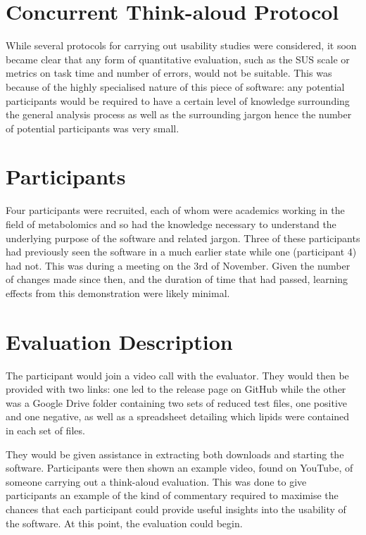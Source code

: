 \documentclass{l4proj}
\begin{document}
\section{Concurrent Think-aloud Protocol} \label{think-aloud-protocol}
While several protocols for carrying out usability studies were considered, it soon became clear that any form of quantitative evaluation, such as the SUS scale or metrics on task time and number of errors, would not be suitable. This was because of the highly specialised nature of this piece of software: any potential participants would be required to have a certain level of knowledge surrounding the general analysis process as well as the surrounding jargon hence the number of potential participants was very small.

\section{Participants}
Four participants were recruited, each of whom were academics working in the field of metabolomics and so had the knowledge necessary to understand the underlying purpose of the software and related jargon. Three of these participants had previously seen the software in a much earlier state while one (participant 4) had not. This was during a meeting on the 3rd of November. Given the number of changes made since then, and the duration of time that had passed, learning effects from this demonstration were likely minimal.

\section{Evaluation Description}
The participant would join a video call with the evaluator. They would then be provided with two links: one led to the release page on GitHub while the other was a Google Drive folder containing two sets of reduced test files, one positive and one negative, as well as a spreadsheet detailing which lipids were contained in each set of files.

They would be given assistance in extracting both downloads and starting the software. Participants were then shown an example video, found on YouTube, of someone carrying out a think-aloud evaluation. This was done to give participants an example of the kind of commentary required to maximise the chances that each participant could provide useful insights into the usability of the software. At this point, the evaluation could begin.
\end{document}
